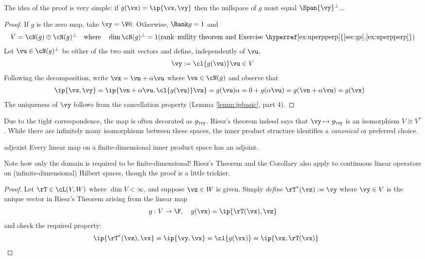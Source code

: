 The idea of the proof is very simple: if $g(\vx)=\ip{\vx,\vy}$ then the nullspace of $g$ must equal $\Span\{\vy\}^\perp$\ldots

\begin{proof}
If $g$ is the zero map, take $\vy=\V0$. Otherwise, $\Rank g=1$ and
\[V=\cN(g)\oplus \cN(g)^\perp\quad\text{where}\quad\dim\cN(g)^\perp=1\hfill (\text{rank--nullity theorem and Exercise \hyperref[ex:uperpperp]{\ref*{sec:gs}.\ref*{ex:uperpperp}}})\]
Let $\vu\in \cN(g)^\perp$ be either of the two unit vectors and define, independently of $\vu$,
\[\vy:=\cl{g(\vu)}\vu\in V\]
Following the decomposition, write $\vx=\vn+\alpha\vu$ where $\vn\in\cN(g)$ and observe that
\begin{align*}
\ip{\vx,\vy}&=\ip{\vn+\alpha\vu,\cl{g(\vu)}\vu} =g(\vu)\alpha =0+g(\alpha\vu) =g(\vn+\alpha\vu) =g(\vx)
\end{align*}
The uniqueness of $\vy$ follows from the cancellation property (Lemma \ref{lemm:ipbasic}, part 4).
\end{proof}

\goodbreak



Due to the tight correspondence, the map is often decorated as $g_\vy$. Riesz's theorem indeed says that $\vy\mapsto g_\vy$ is an isomorphism $V\cong V^*$. While there are infinitely many isomorphisms between these spaces, the inner product structure identifies a \emph{canonical} or preferred choice.

\begin{cor}{}{adjexist}
Every linear map on a finite-dimensional inner product space has an adjoint.
\end{cor}



Note how only the domain is required to be finite-dimensional! Riesz's Theorem and the Corollary also apply to continuous linear operators on (infinite-dimensional) Hilbert spaces, though the proof is a little trickier.


\begin{proof}
Let $\rT\in\cL(V,W)$ where $\dim V<\infty$, and suppose $\vz\in W$ is given. Simply \emph{define} $\rT^*(\vz):=\vy$ where $\vy\in V$ is the unique vector in Riesz's Theorem arising from the linear map
\[g:V\to\F,\quad g(\vx)=\ip{\rT(\vx),\vz}\]
and check the required property:
\[\ip{\rT^*(\vz),\vx}=\ip{\vy,\vx}=\cl{g(\vx)} =\ip{\vz,\rT(\vx)}\tag*{\qedhere}\]
\end{proof}

\goodbreak



